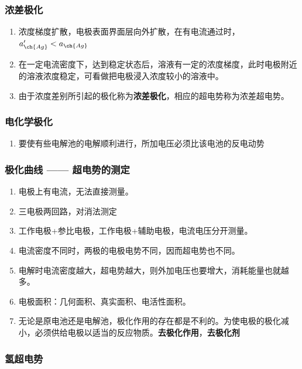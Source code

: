 \subsubsection{浓差极化}

\begin{enumerate}
    \item 浓度梯度扩散，电极表面界面层向外扩散，在有电流通过时，$ a'_{\ch{Ag}} < a_{\ch{Ag}} $
    \item 在一定电流密度下，达到稳定状态后，溶液有一定的浓度梯度，此时电极附近的溶液浓度稳定，可看做把电极浸入浓度较小的溶液中。
    \item 由于浓度差别所引起的极化称为\textbf{浓差极化}，相应的超电势称为浓差超电势。
\end{enumerate}

\subsubsection{电化学极化}

\begin{enumerate}
    \item 要使有些电解池的电解顺利进行，所加电压必须比该电池的反电动势
\end{enumerate}

\subsubsection{极化曲线 —— 超电势的测定}

\begin{enumerate}
    \item 电极上有电流，无法直接测量。
    \item 三电极两回路，对消法测定
    \item 工作电极+参比电极，工作电极+辅助电极，电流电压分开测量。
    \item 电流密度不同时，两极的电极电势不同，因而超电势也不同。
    \item 电解时电流密度越大，超电势越大，则外加电压也要增大，消耗能量也就越多。
    \item 电极面积：几何面积、真实面积、电活性面积。
    \item 无论是原电池还是电解池，极化作用的存在都是不利的。为使电极的极化减小，必须供给电极以适当的反应物质。\textbf{去极化作用}，\textbf{去极化剂}
\end{enumerate}

\subsubsection{氢超电势}


